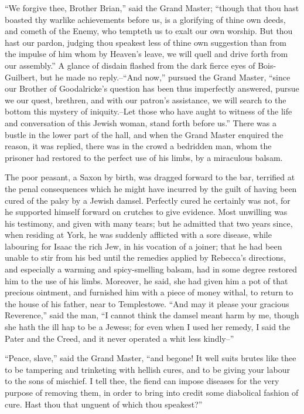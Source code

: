 ``We forgive thee, Brother Brian,'' said the Grand Master; ``though that
thou hast boasted thy warlike achievements before us, is a glorifying of
thine own deeds, and cometh of the Enemy, who tempteth us to exalt our
own worship. But thou hast our pardon, judging thou speakest less of
thine own suggestion than from the impulse of him whom by Heaven's
leave, we will quell and drive forth from our assembly.'' A glance of
disdain flashed from the dark fierce eyes of Bois-Guilbert, but he made
no reply.--``And now,'' pursued the Grand Master, ``since our Brother of
Goodalricke's question has been thus imperfectly answered, pursue we our
quest, brethren, and with our patron's assistance, we will search to the
bottom this mystery of iniquity.--Let those who have aught to witness of
the life and conversation of this Jewish woman, stand forth before us.''
There was a bustle in the lower part of the hall, and when the Grand
Master enquired the reason, it was replied, there was in the crowd a
bedridden man, whom the prisoner had restored to the perfect use of his
limbs, by a miraculous balsam.

The poor peasant, a Saxon by birth, was dragged forward to the bar,
terrified at the penal consequences which he might have incurred by the
guilt of having been cured of the palsy by a Jewish damsel. Perfectly
cured he certainly was not, for he supported himself forward on crutches
to give evidence. Most unwilling was his testimony, and given with many
tears; but he admitted that two years since, when residing at York, he
was suddenly afflicted with a sore disease, while labouring for Isaac
the rich Jew, in his vocation of a joiner; that he had been unable to
stir from his bed until the remedies applied by Rebecca's directions,
and especially a warming and spicy-smelling balsam, had in some degree
restored him to the use of his limbs. Moreover, he said, she had given
him a pot of that precious ointment, and furnished him with a piece of
money withal, to return to the house of his father, near to Templestowe.
``And may it please your gracious Reverence,'' said the man, ``I cannot
think the damsel meant harm by me, though she hath the ill hap to be a
Jewess; for even when I used her remedy, I said the Pater and the Creed,
and it never operated a whit less kindly--''

``Peace, slave,'' said the Grand Master, ``and begone! It well suits
brutes like thee to be tampering and trinketing with hellish cures, and
to be giving your labour to the sons of mischief. I tell thee, the fiend
can impose diseases for the very purpose of removing them, in order to
bring into credit some diabolical fashion of cure. Hast thou that
unguent of which thou speakest?''

